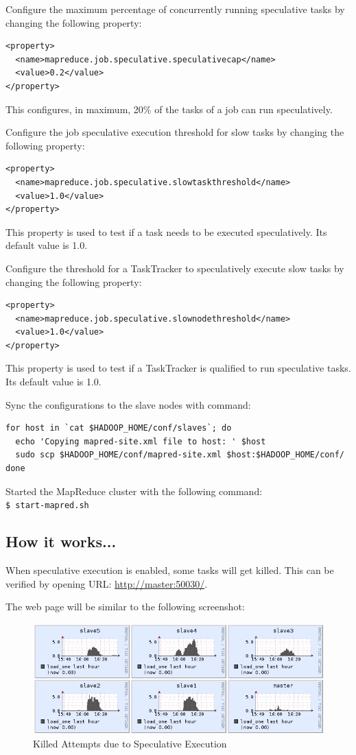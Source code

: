 Configure the maximum percentage of concurrently running speculative tasks by changing the following property:
\lstset{style=bashstyle}
\begin{lstlisting}
<property>
  <name>mapreduce.job.speculative.speculativecap</name>
  <value>0.2</value>
</property>
\end{lstlisting}
This configures, in maximum, 20\% of the tasks of a job can run speculatively.


Configure the job speculative execution threshold for slow tasks by changing the following property:
\lstset{style=bashstyle}
\begin{lstlisting}
<property>
  <name>mapreduce.job.speculative.slowtaskthreshold</name>
  <value>1.0</value>
</property>
\end{lstlisting}

This property is used to test if a task needs to be executed speculatively. Its default value is 1.0.


Configure the threshold for a TaskTracker to speculatively execute slow tasks by changing the following property:
\lstset{style=bashstyle}
\begin{lstlisting}
<property>
  <name>mapreduce.job.speculative.slownodethreshold</name>
  <value>1.0</value>
</property>
\end{lstlisting}
This property is used to test if a TaskTracker is qualified to run speculative tasks. Its default value is 1.0.


Sync the configurations to the slave nodes with command:
\lstset{style=bashstyle}
\begin{lstlisting}
for host in `cat $HADOOP_HOME/conf/slaves`; do
  echo 'Copying mapred-site.xml file to host: ' $host
  sudo scp $HADOOP_HOME/conf/mapred-site.xml $host:$HADOOP_HOME/conf/
done
\end{lstlisting}

Started the MapReduce cluster with the following command:\\
\verb|$ start-mapred.sh|

\subsection*{How it works...}
When speculative execution is enabled, some tasks will get killed. This can be verified by opening URL: \url{http://master:50030/}.

The web page will be similar to the following screenshot:\\
\begin{figure}[h]
  \centering
  \includegraphics[width=.8\textwidth]{figs/5163os_06_10.png}
  \caption{Killed Attempts due to Speculative Execution}\label{fig:killed.jobs.speculative}
\end{figure} 

